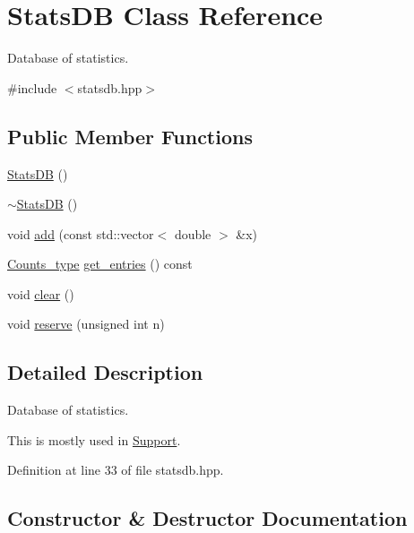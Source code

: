 \hypertarget{class_stats_d_b}{}\section{Stats\+DB Class Reference}
\label{class_stats_d_b}


Database of statistics.  




{\ttfamily \#include $<$statsdb.\+hpp$>$}

\subsection*{Public Member Functions}
\begin{DoxyCompactItemize}
\item 
\hyperlink{class_stats_d_b_a454159e71dfe6af418dfdd8704c38c8c}{Stats\+DB} ()
\item 
\hyperlink{class_stats_d_b_ab4a9371d706b7418df5cb44e81fb5429}{$\sim$\+Stats\+DB} ()
\item 
void \hyperlink{class_stats_d_b_a5759e17b759fcafeec7601188aaa8266}{add} (const std\+::vector$<$ double $>$ \&x)
\item 
\hyperlink{typedefs_8hpp_aee40fa17c1fddb63dd1f2b1470ade95b}{Counts\+\_\+type} \hyperlink{class_stats_d_b_a8ed62f6a3939b90b3493de944c9b67fc}{get\+\_\+entries} () const
\item 
void \hyperlink{class_stats_d_b_a5de68def55b0a3b99a8f609815624a00}{clear} ()
\item 
void \hyperlink{class_stats_d_b_a3370b7f2fb16aa047f8a938232a98602}{reserve} (unsigned int n)
\end{DoxyCompactItemize}


\subsection{Detailed Description}
Database of statistics. 

This is mostly used in {\ttfamily \hyperlink{class_support}{Support}}. 

Definition at line 33 of file statsdb.\+hpp.



\subsection{Constructor \& Destructor Documentation}
\mbox{\label{class_stats_d_b_a454159e71dfe6af418dfdd8704c38c8c}} 
